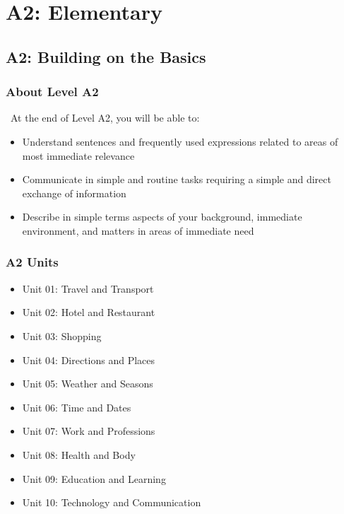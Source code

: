 
\part{A2: Elementary}
\label{part:a2}

\chapter{A2: Building on the Basics}
\label{chap:a2}

\section*{About Level A2}

\levelAtwo\ At the end of Level A2, you will be able to:

\begin{itemize}
\item Understand sentences and frequently used expressions related to areas of most immediate relevance
\item Communicate in simple and routine tasks requiring a simple and direct exchange of information
\item Describe in simple terms aspects of your background, immediate environment, and matters in areas of immediate need
\end{itemize}

\begin{center}

\end{center}

\section*{A2 Units}
\begin{itemize}
\item Unit 01: Travel and Transport
\item Unit 02: Hotel and Restaurant
\item Unit 03: Shopping
\item Unit 04: Directions and Places
\item Unit 05: Weather and Seasons
\item Unit 06: Time and Dates
\item Unit 07: Work and Professions
\item Unit 08: Health and Body
\item Unit 09: Education and Learning
\item Unit 10: Technology and Communication
\end{itemize}

